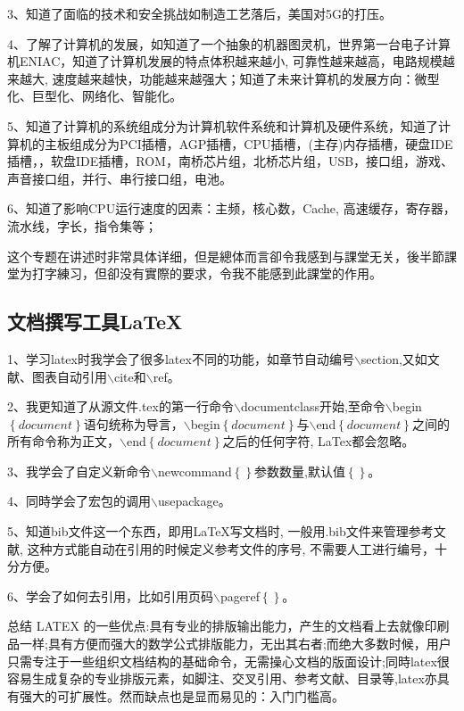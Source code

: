 \documentclass[supercite]{Experimental_Report}
\theoremstyle{definition}
\begin{document}
	3、知道了面临的技术和安全挑战如制造工艺落后，美国对5G的打压。
	
	4、了解了计算机的发展，如知道了一个抽象的机器图灵机，世界第一台电子计算机ENIAC，知道了计算机发展的特点体积越来越小, 可靠性越来越高，电路规模越来越大, 速度越来越快，功能越来越强大；知道了未来计算机的发展方向：微型化、巨型化、网络化、智能化。
	
	5、知道了计算机的系统组成分为计算机软件系统和计算机及硬件系统，知道了计算机的主板组成分为PCI插槽，AGP插槽，CPU插槽，(主存)内存插槽，硬盘IDE插槽，，软盘IDE插槽，ROM，南桥芯片组，北桥芯片组，USB，接口组，游戏、声音接口组，并行、串行接口组，电池。
	
	6、知道了影响CPU运行速度的因素：主频，核心数，Cache, 高速缓存，寄存器，流水线，字长，指令集等；
	
	这个专题在讲述时非常具体详细，但是總体而言卻令我感到与課堂无关，後半節課堂为打字練习，但卻没有實際的要求，令我不能感到此課堂的作用。	
	\newpage
	\subsection{文档撰写工具LaTeX}
	
	1、学习latex时我学会了很多latex不同的功能，如章节自动编号$\backslash$section,又如文献、图表自动引用$\backslash$cite和$\backslash$ref。
	
	2、我更知道了从源文件.tex的第一行命令$\backslash$documentclass开始,至命令$\backslash$begin$\left\{document\right\}$语句统称为导言，$\backslash$begin$\left\{document\right\}$与$\backslash$end$\left\{document\right\}$之间的所有命令称为正文，$\backslash$end$\left\{document\right\}$之后的任何字符, LaTex都会忽略。
	
	3、我学会了自定义新命令$\backslash$newcommand$\left\{\right\}$参数数量,默认值$\left\{\right\}$。
	
	4、同時学会了宏包的调用$\backslash$usepackage。
	
	5、知道bib文件这一个东西，即用LaTeX写文档时, 一般用.bib文件来管理参考文献, 这种方式能自动在引用的时候定义参考文件的序号, 不需要人工进行编号，十分方便。
	
	6、学会了如何去引用，比如引用页码$\backslash$pageref$\left\{\right\}$。
	
	总结 LATEX 的一些优点:具有专业的排版输出能力，产生的文档看上去就像印刷品一样;具有方便而强大的数学公式排版能力，无出其右者;而绝大多数时候，用户只需专注于一些组织文档结构的基础命令，无需操心文档的版面设计;同時latex很容易生成复杂的专业排版元素，如脚注、交叉引用、参考文献、目录等,latex亦具有强大的可扩展性。然而缺点也是显而易见的：入门门槛高。
	
\end{document}
